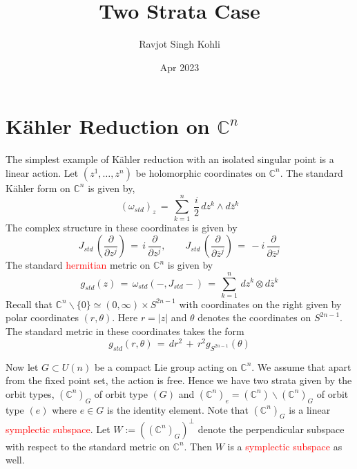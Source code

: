 \documentclass[a4paper,12pt]{article}
\title{Two Strata Case}
\author{Ravjot Singh Kohli}
\date{Apr 2023}
\newcommand{\C}{\mathbb{C}}
\newcommand{\red}[1]{\textcolor{red}{#1}}
\newcommand{\abs}[1]{\lvert #1 \rvert}
\begin{document}
	\maketitle
	
	\section{K\"ahler Reduction on $\C^n$}
	The simplest example of K\"ahler reduction with an isolated singular point is a linear action. Let $(z^1,\dots,z^n)$ be holomorphic coordinates on $\C^n$. The standard K\"ahler form on $\C^n$ is given by,
	\begin{equation}\label{standardkahler}
		(\omega_{std})_{z} \,=\,  \sum_{k=1}^n \, \frac{i}{2} \, dz^k \wedge d\bar{z}^k
	\end{equation}
	The complex structure in these coordinates is given by 
	\begin{equation}
		J_{std}\, \left(\frac{\partial}{\partial z^j} \right) \,=\, i \, \frac{\partial}{\partial z^j}, \qquad J_{std}\, \left( \frac{\partial}{\partial \bar{z}^j} \right) \,=\, -i \, \frac{\partial}{\partial \bar{z}^j}
	\end{equation}
	The standard \red{hermitian} metric on $\C^n$ is given by
	\begin{equation}
		g_{std}(z) \,=\, \omega_{std}(-,J_{std}-) \,=\, \sum_{k=1}^n \, dz^k \otimes d\bar{z}^k
	\end{equation}
	Recall that $\C^n\backslash\{0\} \simeq (0,\infty) \times S^{2n-1}$ with coordinates on the right given by polar coordinates $(r,\theta)$. Here $r = \abs{z}$ and $\theta$ denotes the coordinates on $S^{2n-1}$.
	The standard metric in these coordinates takes the form
	\begin{equation}
		g_{std}(r,\theta) \,=\, dr^2 \,+\, r^2 g_{S^{2n-1}}(\theta)
	\end{equation}
	
	Now let $G\subset U(n)$ be a compact Lie group acting on $\C^n$. We assume that apart from the fixed point set, the action is free. Hence we have two strata given by the orbit types, $(\C^n)_G$ of orbit type $(G)$ and $(\C^n)_e=(\C^n)\backslash (\C^n)_{G}$ of orbit type $(e)$ where $e\in G$ is the identity element. Note that $(\C^n)_G$ is a linear \red{symplectic subspace}. Let $W:= ((\C^n)_G)^\perp$ denote the perpendicular subspace with respect to the standard metric on $\C^n$. Then $W$ is a \red{symplectic subspace} as well.
	
\end{document}
